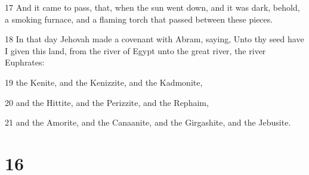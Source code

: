 \par 17 And it came to pass, that, when the sun went down, and it was dark, behold, a smoking furnace, and a flaming torch that passed between these pieces.
\par 18 In that day Jehovah made a covenant with Abram, saying, Unto thy seed have I given this land, from the river of Egypt unto the great river, the river Euphrates:
\par 19 the Kenite, and the Kenizzite, and the Kadmonite,
\par 20 and the Hittite, and the Perizzite, and the Rephaim,
\par 21 and the Amorite, and the Canaanite, and the Girgashite, and the Jebusite.

\chapter{16}

